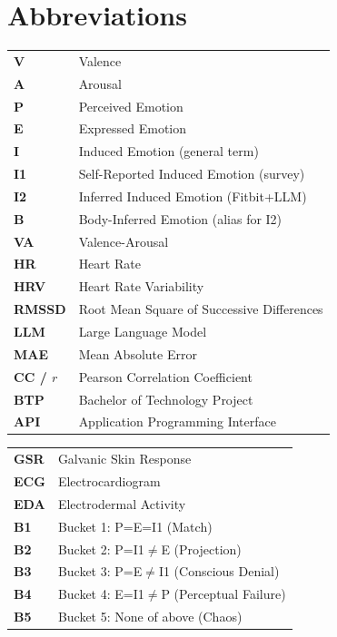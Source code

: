 \documentclass[11pt, a4paper]{report}
\begin{document}
\chapter*{Abbreviations}
\vspace{0.5cm}
\noindent
\begin{small}
\begin{tabular}{@{}ll@{}}
\textbf{V} & Valence \\
\textbf{A} & Arousal \\
\textbf{P} & Perceived Emotion \\
\textbf{E} & Expressed Emotion \\
\textbf{I} & Induced Emotion (general term) \\
\textbf{I1} & Self-Reported Induced Emotion (survey) \\
\textbf{I2} & Inferred Induced Emotion (Fitbit+LLM) \\
\textbf{B} & Body-Inferred Emotion (alias for I2) \\
\textbf{VA} & Valence-Arousal \\
\textbf{HR} & Heart Rate \\
\textbf{HRV} & Heart Rate Variability \\
\textbf{RMSSD} & Root Mean Square of Successive Differences \\
\textbf{LLM} & Large Language Model \\
\textbf{MAE} & Mean Absolute Error \\
\textbf{CC / $r$} & Pearson Correlation Coefficient \\
\textbf{BTP} & Bachelor of Technology Project \\
\textbf{API} & Application Programming Interface \\
\end{tabular}
\hfill
\begin{tabular}{@{}ll@{}}
\textbf{GSR} & Galvanic Skin Response \\
\textbf{ECG} & Electrocardiogram \\
\textbf{EDA} & Electrodermal Activity \\
\textbf{B1} & Bucket 1: P=E=I1 (Match) \\
\textbf{B2} & Bucket 2: P=I1$\neq$E (Projection) \\
\textbf{B3} & Bucket 3: P=E$\neq$I1 (Conscious Denial) \\
\textbf{B4} & Bucket 4: E=I1$\neq$P (Perceptual Failure) \\
\textbf{B5} & Bucket 5: None of above (Chaos) \\

\end{tabular}
\end{small}
\end{document}
